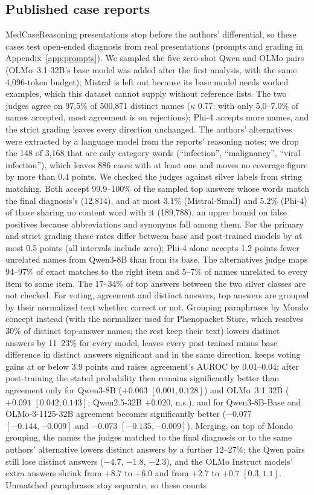 \documentclass[11pt]{article}
\begin{document}
\subsection{Published case reports}\label{sec:medcase}
MedCaseReasoning presentations stop before the authors' differential, so these cases test open-ended diagnosis from real presentations (prompts and grading in Appendix~\ref{app:prompts}). We sampled the five zero-shot Qwen and OLMo pairs (OLMo~3.1 32B's base model was added after the first analysis, with the same 4,096-token budget); Mistral is left out because its base model needs worked examples, which this dataset cannot supply without reference lists. The two judges agree on 97.5\% of 500,871 distinct names ($\kappa$ 0.77; with only 5.0--7.0\% of names accepted, most agreement is on rejections); Phi-4 accepts more names, and the strict grading leaves every direction unchanged. The authors' alternatives were extracted by a language model from the reports' reasoning notes; we drop the 148 of 3,168 that are only category words (``infection'', ``malignancy'', ``viral infection''), which leaves 886 cases with at least one and moves no coverage figure by more than 0.4 points. We checked the judges against silver labels from string matching. Both accept 99.9--100\% of the sampled top answers whose words match the final diagnosis's (12,814), and at most 3.1\% (Mistral-Small) and 5.2\% (Phi-4) of those sharing no content word with it (189,788), an upper bound on false positives because abbreviations and synonyms fall among them. For the primary and strict grading these rates differ between base and post-trained models by at most 0.5 points (all intervals include zero); Phi-4 alone accepts 1.2 points fewer unrelated names from Qwen3-8B than from its base. The alternatives judge maps 94--97\% of exact matches to the right item and 5--7\% of names unrelated to every item to some item. The 17--34\% of top answers between the two silver classes are not checked. For voting, agreement and distinct answers, top answers are grouped by their normalized text whether correct or not. Grouping paraphrases by Mondo concept instead (with the normalizer used for Phenopacket Store, which resolves 30\% of distinct top-answer names; the rest keep their text) lowers distinct answers by 11--23\% for every model, leaves every post-trained minus base difference in distinct answers significant and in the same direction, keeps voting gains at or below 3.9 points and raises agreement's AUROC by 0.01--0.04; after post-training the stated probability then remains significantly better than agreement only for Qwen3-8B ($+0.063$ $[0.001,0.128]$) and OLMo~3.1 32B ($+0.091$ $[0.042,0.143]$; Qwen2.5-32B $+0.020$, n.s.), and for Qwen3-8B-Base and OLMo-3-1125-32B agreement becomes significantly better ($-0.077$ $[-0.144,-0.009]$ and $-0.073$ $[-0.135,-0.009]$). Merging, on top of Mondo grouping, the names the judges matched to the final diagnosis or to the same authors' alternative lowers distinct answers by a further 12--27\%; the Qwen pairs still lose distinct answers ($-4.7$, $-1.8$, $-2.3$), and the OLMo Instruct models' extra answers shrink from $+8.7$ to $+6.0$ and from $+2.7$ to $+0.7$ $[0.3,1.1]$. Unmatched paraphrases stay separate, so these counts 
\end{document}
